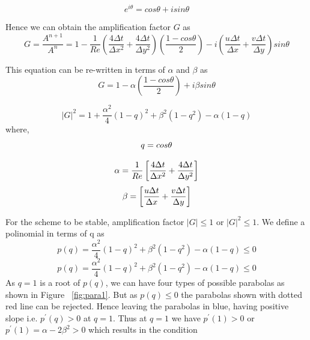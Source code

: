 \documentclass{article}
\begin{document}
\begin{equation}
e^{i\theta} = cos \theta +isin \theta
\end{equation}

Hence we can obtain the amplification factor $G$ as 
\begin{equation}
G = \frac{A^{n+1}}{A^n} = 1-\frac{1}{Re}\left(\frac{4\Delta t }{\Delta x^2}+\frac{4\Delta t}{\Delta y^2}\right)\left(\frac{1-cos\theta}{2}\right) - i\left(\frac{u\Delta t}{\Delta x}+\frac{v\Delta t }{\Delta y}\right)sin\theta
\end{equation}

This equation can be re-written in terms of $\alpha$ and $\beta$ as
 \begin{equation}
G = 1-\alpha \left(\frac{1-cos\theta}{2} \right)+i\beta sin\theta
\end{equation}

 \begin{equation}
|G|^2 = 1+\frac{\alpha^2}{4} (1-q)^2+\beta^2 (1-q^2) -\alpha (1-q)
\end{equation}
where, 
\begin{equation}
q=cos\theta \notag
\end{equation}

\begin{equation}
\alpha = \frac{1}{Re}\left[\frac{4\Delta t}{\Delta x^2}+\frac{4\Delta t}{\Delta y^2}\right]  \notag
\end{equation}
\begin{equation}
\beta = \left[\frac{u\Delta t}{\Delta x}+\frac{v\Delta t }{\Delta y}\right]  \notag
\end{equation} 



 For the scheme to be stable, amplification factor $|G| \leq 1$ or $|G|^2 \leq 1$. We define a polinomial in terms of q as 
 \begin{equation}
p(q)= \frac{\alpha^2}{4} (1-q)^2+\beta^2 (1-q^2) -\alpha (1-q)  \leq 0
\end{equation}
 \begin{equation}
p(q)= \frac{\alpha^2}{4} (1-q)^2+\beta^2 (1-q^2) -\alpha (1-q)  \leq 0
\end{equation}
As $q = 1$ is a root of $p(q)$, we can have four types of possible parabolas as shown in Figure ~\ref{fig:para1}. But as $p(q) \leq 0$ the parabolas shown with dotted red line can be rejected. Hence leaving the parabolas in blue, having positive slope i.e. $p^{'}(q)>0$ at $q=1$. Thus at $q=1$ we have  $p^{'}(1)>0$ or  $p^{'}(1) = \alpha- 2\beta^2>0$ which results in the condition
\end{document}
